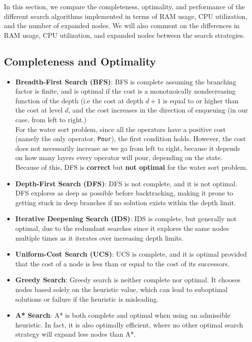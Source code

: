 \documentclass{article}
\begin{document}
In this section, we compare the completeness, optimality, and performance of the different search algorithms implemented in terms of RAM usage, CPU utilization, and the number of expanded nodes. We will also comment on the differences in RAM usage, CPU utilization, and expanded nodes between the search strategies.

\subsection{Completeness and Optimality}
\begin{itemize}
    \item \textbf{Breadth-First Search (BFS)}: BFS is complete assuming the branching factor is finite, and is optimal if the cost is a monotnoically nondecreasing function of the depth (i.e the cost at depth $d+1$ is equal to or higher than the cost at level $d$, and the cost increases in the direction of enqueuing (in our case, from left to right.) \\
    
    For the water sort problem, since all the operators have a positive cost (namely the only operator, \texttt{Pour}), the first condition holds. However, the cost does not necessarily increase as we go from left to right, because it depends on how many layers every operator will pour, depending on the state. Because of this, DFS is \textbf{correct} but \textbf{not optimal} for the water sort problem.

    \item \textbf{Depth-First Search (DFS)}: DFS is not complete, and it is not optimal. DFS explores as deep as possible before backtracking, making it prone to getting stuck in deep branches if no solution exists within the depth limit.

    \item \textbf{Iterative Deepening Search (IDS)}: IDS is complete, but generally not optimal, due to the redundant searches since it explores the same nodes multiple times as it iterates over increasing depth limits.

    \item \textbf{Uniform-Cost Search (UCS)}: UCS is complete, and it is optimal provided that the cost of a node is less than or equal to the cost of its successors.

    \item \textbf{Greedy Search}: Greedy search is neither complete nor optimal. It chooses nodes based solely on the heuristic value, which can lead to suboptimal solutions or failure if the heuristic is misleading.

    \item \textbf{A* Search}: A* is both complete and optimal when using an admissible heuristic. In fact, it is also optimally efficient, where no other optimal search strategy will expand less nodes than A*.
\end{itemize}
\end{document}
